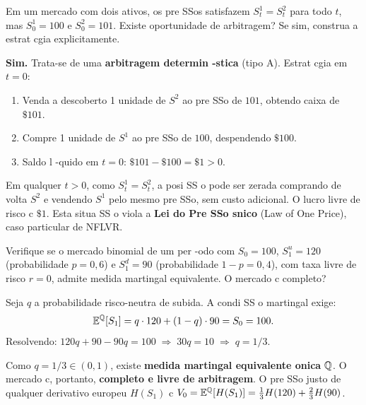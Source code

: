 \begin{exer}
\label{ex:arb_ident}
Em um mercado com dois ativos, os pre SSos satisfazem $S^1_t = S^2_t$ para todo $t$, mas $S^1_0 = 100$ e $S^2_0 = 101$. Existe oportunidade de arbitragem? Se sim, construa a estrat cgia explicitamente.
\end{exer}

\begin{sol}
\textbf{Sim.} Trata-se de uma \textbf{arbitragem determin -stica} (tipo A). Estrat cgia em $t=0$:
\begin{enumerate}
 \item Venda a descoberto 1 unidade de $S^2$ ao pre SSo de $101$, obtendo caixa de $\$101$.
 \item Compre 1 unidade de $S^1$ ao pre SSo de $100$, despendendo $\$100$.
 \item Saldo l -quido em $t=0$: $\$101 - \$100 = \$1 > 0$.
\end{enumerate}
Em qualquer $t>0$, como $S^1_t = S^2_t$, a posi SS o pode ser zerada comprando de volta $S^2$ e vendendo $S^1$ pelo mesmo pre SSo, sem custo adicional. O lucro livre de risco c $\$1$. Esta situa SS o viola a \textbf{Lei do Pre SSo snico} (Law of One Price), caso particular de NFLVR.
\end{sol}

\begin{exer}
\label{ex:medida_mart}
Verifique se o mercado binomial de um per -odo com $S_0=100$, $S_1^u=120$ (probabilidade $p=0{,}6$) e $S_1^d=90$ (probabilidade $1-p=0{,}4$), com taxa livre de risco $r=0$, admite medida martingal equivalente. O mercado c completo?
\end{exer}

\begin{sol}
Seja $q$ a probabilidade risco-neutra de subida. A condi SS o martingal exige:
\begin{equation}
 \mathbb{E}^{\mathbb{Q}}[S_1] = q\cdot 120 + (1-q)\cdot 90 = S_0 = 100.
\end{equation}
Resolvendo: $120q + 90 - 90q = 100 \;\Rightarrow\; 30q = 10 \;\Rightarrow\; q = 1/3$.

Como $q = 1/3\in(0,1)$, existe \textbf{medida martingal equivalente onica} $\mathbb{Q}$. O mercado c, portanto, \textbf{completo e livre de arbitragem}. O pre SSo justo de qualquer derivativo europeu $H(S_1)$ c $V_0 = \mathbb{E}^{\mathbb{Q}}[H(S_1)] = \frac{1}{3}H(120) + \frac{2}{3}H(90)$.
\end{sol}

